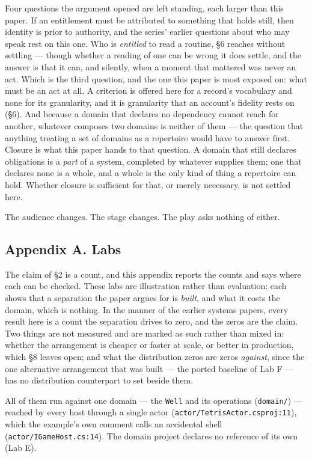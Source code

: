 \documentclass[
]{article}
\newcounter{none} %
\begin{document}
Four questions the argument opened are left standing, each larger than
this paper. If an entitlement must be attributed to something that holds
still, then identity is prior to authority, and the series' earlier
questions about who may speak rest on this one. Who is \emph{entitled}
to read a routine, §6 reaches without settling --- though whether a
reading of one can be wrong it does settle, and the answer is that it
can, and silently, when a moment that mattered was never an act. Which
is the third question, and the one this paper is most exposed on: what
must be an act at all. A criterion is offered here for a record's
vocabulary and none for its granularity, and it is granularity that an
account's fidelity rests on (§6). And because a domain that declares no
dependency cannot reach for another, whatever composes two domains is
neither of them --- the question that anything treating a set of domains
as a repertoire would have to answer first. Closure is what this paper
hands to that question. A domain that still declares obligations is a
\emph{part} of a system, completed by whatever supplies them; one that
declares none is a whole, and a whole is the only kind of thing a
repertoire can hold. Whether closure is sufficient for that, or merely
necessary, is not settled here.

The audience changes. The stage changes. The play asks nothing of
either.

\subsection{Appendix A. Labs}\label{appendix-a.-labs}

The claim of §2 is a count, and this appendix reports the counts and
says where each can be checked. These labs are illustration rather than
evaluation: each shows that a separation the paper argues for is
\emph{built}, and what it costs the domain, which is nothing. In the
manner of the earlier systems papers, every result here is a count the
separation drives to zero, and the zeros are the claim. Two things are
not measured and are marked as such rather than mixed in: whether the
arrangement is cheaper or faster at scale, or better in production,
which §8 leaves open; and what the distribution zeros are zeros
\emph{against}, since the one alternative arrangement that was built ---
the ported baseline of Lab F --- has no distribution counterpart to set
beside them.

All of them run against one domain --- the \texttt{Well} and its
operations (\texttt{domain/}) --- reached by every host through a single
actor (\texttt{actor/TetrisActor.csproj:11}), which the example's own
comment calls an accidental shell (\texttt{actor/IGameHost.cs:14}). The
domain project declares no reference of its own (Lab E).
\end{document}
